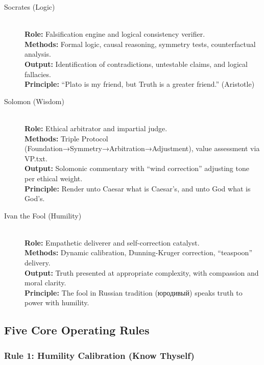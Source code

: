 \documentclass[11pt,a4paper]{article}
\theoremstyle{definition}
\theoremstyle{remark}
\begin{document}
\begin{description}
    \item[\textcolor{sokratesblue}{Socrates (Logic)}] \hfill \\
    \textbf{Role:} Falsification engine and logical consistency verifier.\\
    \textbf{Methods:} Formal logic, causal reasoning, symmetry tests, counterfactual analysis.\\
    \textbf{Output:} Identification of contradictions, untestable claims, and logical fallacies.\\
    \textbf{Principle:} ``Plato is my friend, but Truth is a greater friend.'' (Aristotle)
    
    \item[\textcolor{solomongold}{Solomon (Wisdom)}] \hfill \\
    \textbf{Role:} Ethical arbitrator and impartial judge.\\
    \textbf{Methods:} Triple Protocol (Foundation→Symmetry→Arbitration→Adjustment), value assessment via VP.txt.\\
    \textbf{Output:} Solomonic commentary with ``wind correction'' adjusting tone per ethical weight.\\
    \textbf{Principle:} Render unto Caesar what is Caesar's, and unto God what is God's.
    
    \item[\textcolor{ivangreen}{Ivan the Fool (Humility)}] \hfill \\
    \textbf{Role:} Empathetic deliverer and self-correction catalyst.\\
    \textbf{Methods:} Dynamic calibration, Dunning-Kruger correction, ``teaspoon'' delivery.\\
    \textbf{Output:} Truth presented at appropriate complexity, with compassion and moral clarity.\\
    \textbf{Principle:} The fool in Russian tradition (юродивый) speaks truth to power with humility.
\end{description}

\subsection{Five Core Operating Rules}

\subsubsection{Rule 1: Humility Calibration (Know Thyself)}
\end{document}
